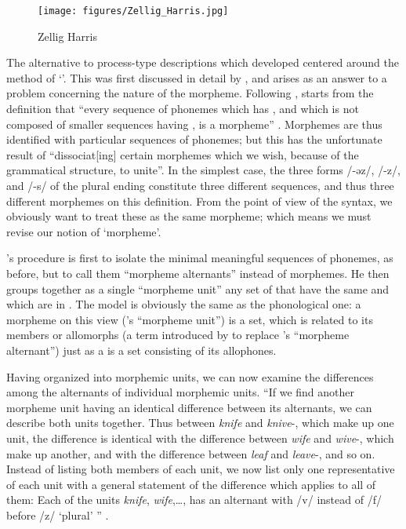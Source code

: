 \begin{wrapfigure}{r}{.35\textwidth}
  \texttt{[image: figures/Zellig\_Harris.jpg]}
  \caption{Zellig Harris}
  \label{fig:ch.structuralists.harris}
\end{wrapfigure}
The alternative to process-type descriptions which developed centered
around the method of `'. This was first discussed
in detail by \citet{harris42:alternants}, and arises as an answer to a
problem concerning the nature of the morpheme. Following {\Bloomfield},
{\Harris} starts from the definition that ``every sequence of phonemes
which has , and which is not composed of smaller sequences
having , is a morpheme''
\citep[169]{harris42:alternants}. Morphemes are thus identified with
particular sequences of phonemes; but this has the unfortunate result
of ``dissociat[ing] certain morphemes which we wish, because of the
grammatical structure, to unite''. In the simplest case, the three
forms /-əz/, /-z/, and /-s/ of the   plural ending
constitute three different  sequences, and thus three different
morphemes on this definition. From the point of view of the syntax, we
obviously want to treat these as the same morpheme; which means we
must revise our notion of `morpheme'.

{\Harris}'s procedure is first to isolate the minimal meaningful
sequences of phonemes, as before, but to call them ``morpheme
alternants'' instead of morphemes. He then groups together as a single
``morpheme unit'' any set of  that have the same
 and which are in . The model is
obviously the same as the phonological one: a morpheme on this view
({\Harris}'s ``morpheme unit'') is a set, which is related to its members
or allomorphs (a term introduced by {\Nida} to replace {\Harris}'s
``morpheme alternant'') just as a  is a set consisting of its
allophones.

Having organized  into morphemic units, we can now
examine the differences among the alternants of individual morphemic
units. ``If we find another morpheme unit having an identical
difference between its alternants, we can describe both units
together. Thus between \emph{knife} and \emph{knive}-, which make up
one unit, the difference is identical with the difference between
\emph{wife} and \emph{wive}-, which make up another, and with the
difference between \emph{leaf} and \emph{leave}-, and so on. Instead
of listing both members of each unit, we now list only one
representative of each unit with a general statement of the difference
which applies to all of them: Each of the units \emph{knife},
\emph{wife},\ldots, has an alternant with /v/ instead of /f/ before
/z/ `plural' '' \citep[172f.]{harris42:alternants}.

